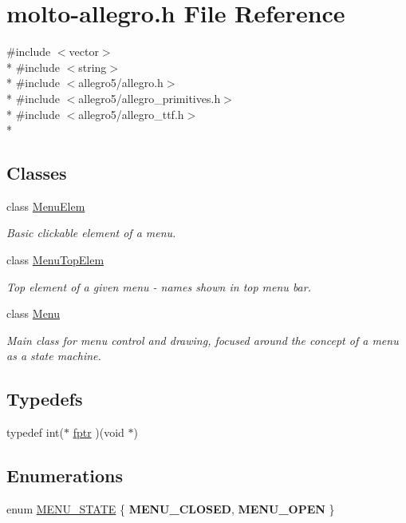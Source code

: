 \hypertarget{molto-allegro_8h}{\section{molto-\/allegro.h File Reference}
\label{molto-allegro_8h}
}
{\ttfamily \#include $<$vector$>$}\\*
{\ttfamily \#include $<$string$>$}\\*
{\ttfamily \#include $<$allegro5/allegro.\-h$>$}\\*
{\ttfamily \#include $<$allegro5/allegro\-\_\-primitives.\-h$>$}\\*
{\ttfamily \#include $<$allegro5/allegro\-\_\-ttf.\-h$>$}\\*
\subsection*{Classes}
\begin{DoxyCompactItemize}
\item 
class \hyperlink{classMenuElem}{Menu\-Elem}
\begin{DoxyCompactList}\small\item\em Basic clickable element of a menu. \end{DoxyCompactList}\item 
class \hyperlink{classMenuTopElem}{Menu\-Top\-Elem}
\begin{DoxyCompactList}\small\item\em Top element of a given menu -\/ names shown in top menu bar. \end{DoxyCompactList}\item 
class \hyperlink{classMenu}{Menu}
\begin{DoxyCompactList}\small\item\em Main class for menu control and drawing, focused around the concept of a menu as a state machine. \end{DoxyCompactList}\end{DoxyCompactItemize}
\subsection*{Typedefs}
\begin{DoxyCompactItemize}
\item 
typedef int($\ast$ \hyperlink{molto-allegro_8h_ab4d4c3a68df99ae93deb075950a7e396}{fptr} )(void $\ast$)
\end{DoxyCompactItemize}
\subsection*{Enumerations}
\begin{DoxyCompactItemize}
\item 
enum \hyperlink{molto-allegro_8h_a8b022cbaf1689aca386d8e721bfd9f25}{M\-E\-N\-U\-\_\-\-S\-T\-A\-T\-E} \{ {\bfseries M\-E\-N\-U\-\_\-\-C\-L\-O\-S\-E\-D}, 
{\bfseries M\-E\-N\-U\-\_\-\-O\-P\-E\-N}
 \}
\end{DoxyCompactItemize}
